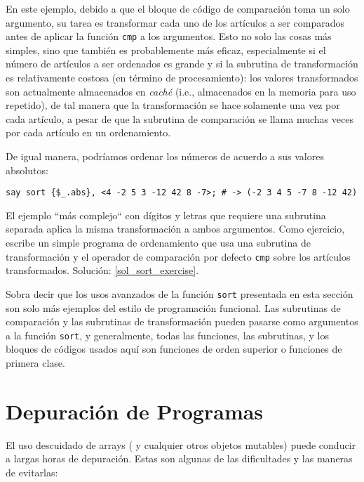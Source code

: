 En este ejemplo, debido a que el bloque de código
de comparación toma un solo argumento, su tarea es
transformar cada uno de los artículos a ser comparados
antes de aplicar la función {\tt cmp}  a los argumentos.
Esto no solo las cosas más simples, sino que también
es probablemente más eficaz, especialmente si 
el número de artículos a ser ordenados es grande y si
la subrutina de transformación es relativamente costosa
(en término de procesamiento): los valores transformados
son actualmente almacenados en \emph{caché} (i.e.,
almacenados en la memoria para uso repetido), de tal manera
que la transformación se hace solamente una vez por cada artículo,
a pesar de que la subrutina de comparación se llama muchas veces por
cada artículo en un ordenamiento.

De igual manera, podríamos ordenar los números de acuerdo 
a sus valores absolutos:

\begin{verbatim}
say sort {$_.abs}, <4 -2 5 3 -12 42 8 -7>; # -> (-2 3 4 5 -7 8 -12 42)
\end{verbatim}

El ejemplo ``más complejo`` con dígitos y letras que requiere
una subrutina separada aplica la misma transformación
a ambos argumentos. Como ejercicio, escribe un simple programa
de ordenamiento que usa una subrutina de transformación y
el operador de comparación por defecto {\tt cmp} sobre
los artículos transformados. Solución: \ref{sol_sort_exercise}.
\label{sort_exercise}

Sobra decir que los usos avanzados de la función {\tt sort}
presentada en esta sección son solo más ejemplos del
estilo de programación funcional. Las subrutinas de comparación
y las subrutinas de transformación pueden pasarse como 
argumentos a la función {\tt sort}, y generalmente, todas
las funciones, las subrutinas, y los bloques de códigos
usados aquí son funciones de orden superior o funciones
de primera clase.

\section{Depuración de Programas}

El uso descuidado de arrays ( y cualquier otros objetos
mutables) puede conducir a largas horas de depuración. 
Estas son algunas de las dificultades y las maneras de
evitarlas:

